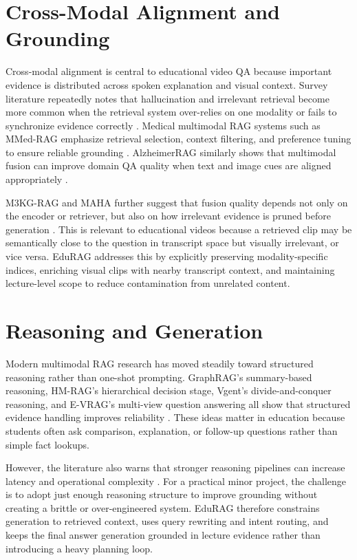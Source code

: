 \documentclass[12pt,a4paper,oneside]{report}
\begin{document}
\section{Cross-Modal Alignment and Grounding}
Cross-modal alignment is central to educational video QA because important evidence is distributed across spoken explanation and visual context. Survey literature repeatedly notes that hallucination and irrelevant retrieval become more common when the retrieval system over-relies on one modality or fails to synchronize evidence correctly \cite{zheng2024retrieval,mei2024survey}. Medical multimodal RAG systems such as MMed-RAG emphasize retrieval selection, context filtering, and preference tuning to ensure reliable grounding \cite{xia2024mmed}. AlzheimerRAG similarly shows that multimodal fusion can improve domain QA quality when text and image cues are aligned appropriately \cite{lahiri2024alzheimer}.

M3KG-RAG and MAHA further suggest that fusion quality depends not only on the encoder or retriever, but also on how irrelevant evidence is pruned before generation \cite{park2024m3kg,rashmi2024multimodal}. This is relevant to educational videos because a retrieved clip may be semantically close to the question in transcript space but visually irrelevant, or vice versa. EduRAG addresses this by explicitly preserving modality-specific indices, enriching visual clips with nearby transcript context, and maintaining lecture-level scope to reduce contamination from unrelated content.

\section{Reasoning and Generation}
Modern multimodal RAG research has moved steadily toward structured reasoning rather than one-shot prompting. GraphRAG's summary-based reasoning, HM-RAG's hierarchical decision stage, Vgent's divide-and-conquer reasoning, and E-VRAG's multi-view question answering all show that structured evidence handling improves reliability \cite{edge2024local,liu2024hmrag,shen2024vgent,xu2024evrag}. These ideas matter in education because students often ask comparison, explanation, or follow-up questions rather than simple fact lookups.

However, the literature also warns that stronger reasoning pipelines can increase latency and operational complexity \cite{singh2024agentic,brown2024systematic}. For a practical minor project, the challenge is to adopt just enough reasoning structure to improve grounding without creating a brittle or over-engineered system. EduRAG therefore constrains generation to retrieved context, uses query rewriting and intent routing, and keeps the final answer generation grounded in lecture evidence rather than introducing a heavy planning loop.
\end{document}
